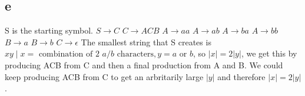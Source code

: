 \documentclass[12pt]{article}
\begin{document}
\subsection*{e} S is the starting symbol. \newline
$S \rightarrow C$ \newline
$C \rightarrow ACB$ \newline
$A \rightarrow aa$ \newline
$A \rightarrow ab$ \newline
$A \rightarrow ba$ \newline
$A \rightarrow bb$ \newline
$B \rightarrow a$ \newline
$B \rightarrow b$ \newline
$C \rightarrow \epsilon$ \newline
The smallest string that S creates is $xy \mid x = \text{ combination of 2 }a/b \text{ characters}, y =  a \text{ or } b$, so $|x| = 2|y|$, we get this by producing ACB from C and then a final production from A and B.  We could keep producing ACB from C to get an arbritarily large $|y|$ and therefore $|x| = 2|y|$.
\end{document}
